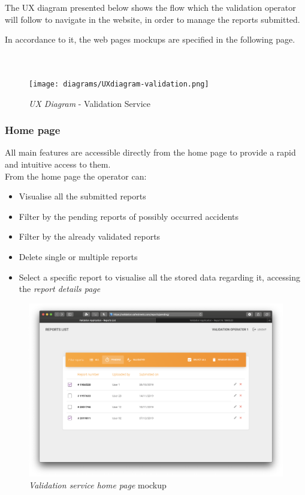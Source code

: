 The UX diagram presented below shows the flow which the validation operator will follow to navigate in the website, in order to manage the reports submitted.

In accordance to it, the web pages mockups are specified in the following page.\\\\\\

\begin{figure}[ht!]
	\centering
	\texttt{[image: diagrams/UXdiagram-validation.png]}
	\caption{
		\label{fig:uxvalidation} 
		\emph{UX Diagram} - Validation Service
	}
\end{figure}

\clearpage
\subsubsection{Home page}
All main features are accessible directly from the home page to provide a rapid and intuitive access to them. \\
From the home page the operator can:
\begin{itemize}
	\item Visualise all the submitted reports
	\item Filter by the pending reports of possibly occurred accidents
	\item Filter by the already validated reports
	\item Delete single or multiple reports
	\item Select a specific report to visualise all the stored data regarding it, accessing the \emph{report details page}\newline\newline
\end{itemize}
 
 \begin{figure}[ht!]
 	\hspace*{-1cm}
			\centering
			\includegraphics[scale=0.3]{mockups/validationApp1.png}
			\caption{
				\label{fig:cc1} 
				\emph{Validation service home page} mockup
			}
		\end{figure}

